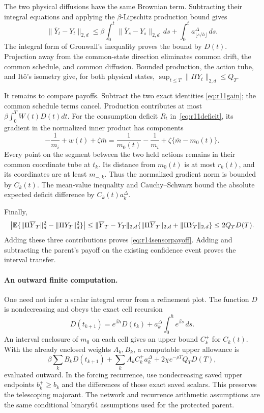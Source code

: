 The two physical diffusions have the same Brownian term. Subtracting
their integral equations and applying the $\beta$-Lipschitz production
bound gives
\[
 \|\overline Y_t-Y_t\|_{2,d}
 \leq\beta\int_0^t\|\overline Y_s-Y_s\|_{2,d}\,ds
       +\int_0^t a_{\lfloor s/h\rfloor}^\Delta\,ds.
\]
The integral form of Gronwall's inequality proves the bound by $D(t)$.
Projection away from the common-state direction eliminates common
drift, the common schedule, and common diffusion. Bounded production,
the action tube, and It\^o's isometry give, for both physical states,
$\sup_{t\leq T}\|\Pi Y_t\|_{2,d}\leq Q_T$.

It remains to compare payoffs. Subtract the two exact identities
\eqref{eq:r11gain}; the common schedule terms cancel. Production
contributes at most $\beta\int_0^TW(t)D(t)dt$.
For the consumption deficit $R_t$ in~\eqref{eq:r11deficit}, its gradient
in the normalized inner product has components
\[
 -\frac1{m_i}+w(t)+\zeta\bar m
  =\frac1{m_0(t)}-\frac1{m_i}
       +\zeta\{\bar m-m_0(t)\}.
\]
Every point on the segment between the two held actions remains in
their common coordinate tube at $t_k$. Its distance from $m_0(t)$ is
at most $r_k(t)$, and its coordinates are at least $m_{-,k}$. Thus the
normalized gradient norm is bounded by $C_k(t)$. The mean-value
inequality and Cauchy--Schwarz bound the absolute expected deficit
difference by $C_k(t)a_k^\Delta$.

Finally,
\[
 \left|\mathbb E\{\|\Pi\overline Y_T\|_d^2-\|\Pi Y_T\|_d^2\}\right|
 \leq\|\overline Y_T-Y_T\|_{2,d}
       \{\|\Pi\overline Y_T\|_{2,d}+\|\Pi Y_T\|_{2,d}\}
 \leq2Q_TD(T).
\]
Adding these three contributions proves
\eqref{eq:r14sensorpayoff}. Adding and subtracting the parent's payoff
on the existing confidence event proves the interval transfer.

\paragraph*{An outward finite computation.}
One need not infer a scalar integral error from a refinement plot.
The function $D$ is nondecreasing and obeys the exact cell recursion
\[
 D(t_{k+1})=e^{\beta h}D(t_k)
                +a_k^\Delta\int_0^h e^{\beta s}\,ds.
\]
An interval enclosure of $m_0$ on each cell gives an upper bound
$C_k^+$ for $C_k(t)$. With the already enclosed weights $A_k,B_k$,
a computable upper allowance is
\[
 \beta\sum_k B_kD(t_{k+1})
       +\sum_k A_kC_k^+a_k^\Delta
       +2\chi e^{-\rho T}Q_TD(T),
\]
evaluated outward. In the forcing recurrence, use nondecreasing saved
upper endpoints $b_k^+\geq b_k$ and the differences of those exact
saved scalars. This preserves the telescoping majorant. The network
and recurrence arithmetic assumptions are the same conditional
binary64 assumptions used for the protected parent.
